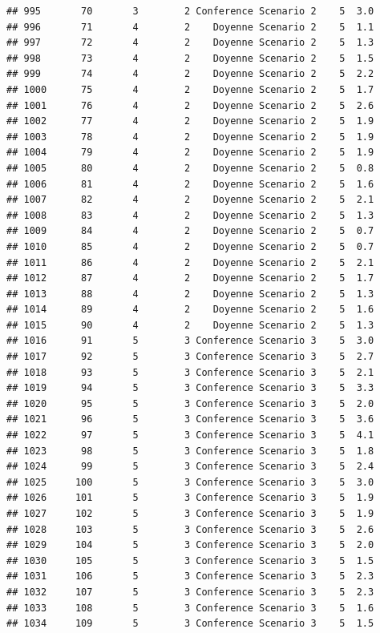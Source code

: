 \documentclass[
]{article}
\begin{document}
\begin{verbatim}
## 995       70       3        2 Conference Scenario 2    5  3.0
## 996       71       4        2    Doyenne Scenario 2    5  1.1
## 997       72       4        2    Doyenne Scenario 2    5  1.3
## 998       73       4        2    Doyenne Scenario 2    5  1.5
## 999       74       4        2    Doyenne Scenario 2    5  2.2
## 1000      75       4        2    Doyenne Scenario 2    5  1.7
## 1001      76       4        2    Doyenne Scenario 2    5  2.6
## 1002      77       4        2    Doyenne Scenario 2    5  1.9
## 1003      78       4        2    Doyenne Scenario 2    5  1.9
## 1004      79       4        2    Doyenne Scenario 2    5  1.9
## 1005      80       4        2    Doyenne Scenario 2    5  0.8
## 1006      81       4        2    Doyenne Scenario 2    5  1.6
## 1007      82       4        2    Doyenne Scenario 2    5  2.1
## 1008      83       4        2    Doyenne Scenario 2    5  1.3
## 1009      84       4        2    Doyenne Scenario 2    5  0.7
## 1010      85       4        2    Doyenne Scenario 2    5  0.7
## 1011      86       4        2    Doyenne Scenario 2    5  2.1
## 1012      87       4        2    Doyenne Scenario 2    5  1.7
## 1013      88       4        2    Doyenne Scenario 2    5  1.3
## 1014      89       4        2    Doyenne Scenario 2    5  1.6
## 1015      90       4        2    Doyenne Scenario 2    5  1.3
## 1016      91       5        3 Conference Scenario 3    5  3.0
## 1017      92       5        3 Conference Scenario 3    5  2.7
## 1018      93       5        3 Conference Scenario 3    5  2.1
## 1019      94       5        3 Conference Scenario 3    5  3.3
## 1020      95       5        3 Conference Scenario 3    5  2.0
## 1021      96       5        3 Conference Scenario 3    5  3.6
## 1022      97       5        3 Conference Scenario 3    5  4.1
## 1023      98       5        3 Conference Scenario 3    5  1.8
## 1024      99       5        3 Conference Scenario 3    5  2.4
## 1025     100       5        3 Conference Scenario 3    5  3.0
## 1026     101       5        3 Conference Scenario 3    5  1.9
## 1027     102       5        3 Conference Scenario 3    5  1.9
## 1028     103       5        3 Conference Scenario 3    5  2.6
## 1029     104       5        3 Conference Scenario 3    5  2.0
## 1030     105       5        3 Conference Scenario 3    5  1.5
## 1031     106       5        3 Conference Scenario 3    5  2.3
## 1032     107       5        3 Conference Scenario 3    5  2.3
## 1033     108       5        3 Conference Scenario 3    5  1.6
## 1034     109       5        3 Conference Scenario 3    5  1.5

\end{verbatim}
\end{document}
